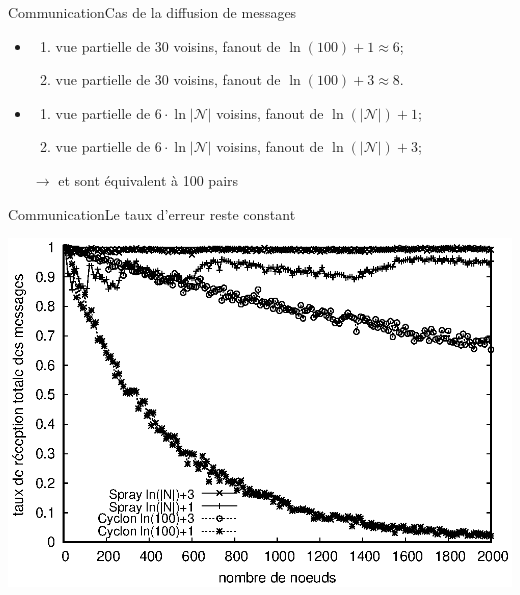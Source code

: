 \begin{frame}{Communication}{Cas de la diffusion de messages}

  \begin{center}
    
  \end{center}

  \begin{itemize}
  \item \CYCLON 
    \begin{enumerate}
    \item vue partielle de 30 voisins, fanout de $\ln(100)+1\approx 6$;
    \item vue partielle de 30 voisins, fanout de  $\ln(100)+3 \approx 8$.
    \end{enumerate}
  \item \SPRAY
    \begin{enumerate}
    \item vue partielle de $6\cdot\ln|\mathcal{N}|$ voisins,
      fanout de $\ln(|\mathcal{N}|)+1$;
    \item vue partielle de $6\cdot\ln|\mathcal{N}|$ voisins,
      fanout de $\ln(|\mathcal{N}|)+3$;
    \end{enumerate}
  \end{itemize}


  \begin{itemize}
  \item[$\rightarrow$] \CYCLON et \SPRAY sont équivalent à 100 pairs
  \end{itemize}
\end{frame}

\begin{frame}{Communication}{Le taux d'erreur reste constant}
  \begin{center}
    \includegraphics[width=1\textwidth]{img/network/hardrate.eps}
  \end{center} 
\end{frame}


